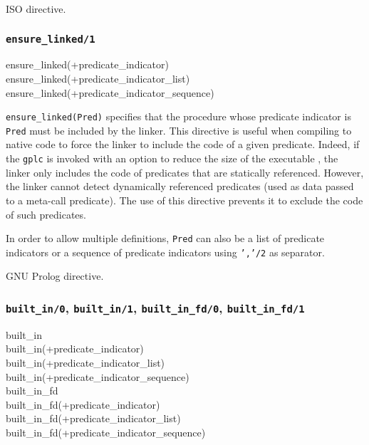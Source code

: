\Portability

ISO directive. 

\subsubsection{\texttt{ensure\_linked/1}}

\begin{TemplatesOneCol}
ensure\_linked(+predicate\_indicator)\\
ensure\_linked(+predicate\_indicator\_list)\\
ensure\_linked(+predicate\_indicator\_sequence)

\end{TemplatesOneCol}

\Description

\texttt{ensure\_linked(Pred)} specifies that the procedure
whose predicate indicator is \texttt{Pred} must be included by the linker.
This directive is useful when compiling to native code to force the linker to
include the code of a given predicate. Indeed, if the \texttt{gplc} is
invoked with an option to reduce the size of the executable
, the linker only includes the code of predicates
that are statically referenced. However, the linker cannot detect dynamically
referenced predicates (used as data passed to a meta-call predicate). The use
of this directive prevents it to exclude the code of such predicates.

In order to allow multiple definitions, \texttt{Pred} can also be a list of
predicate indicators or a sequence of predicate indicators using
\texttt{','/2} as separator.

\Portability

GNU Prolog directive.

\subsubsection{\texttt{built\_in/0},
               \texttt{built\_in/1},
               \texttt{built\_in\_fd/0},
               \texttt{built\_in\_fd/1}}

\begin{TemplatesOneCol}
built\_in\\
built\_in(+predicate\_indicator)\\
built\_in(+predicate\_indicator\_list)\\
built\_in(+predicate\_indicator\_sequence)\\
built\_in\_fd\\
built\_in\_fd(+predicate\_indicator)\\
built\_in\_fd(+predicate\_indicator\_list)\\
built\_in\_fd(+predicate\_indicator\_sequence)

\end{TemplatesOneCol}

